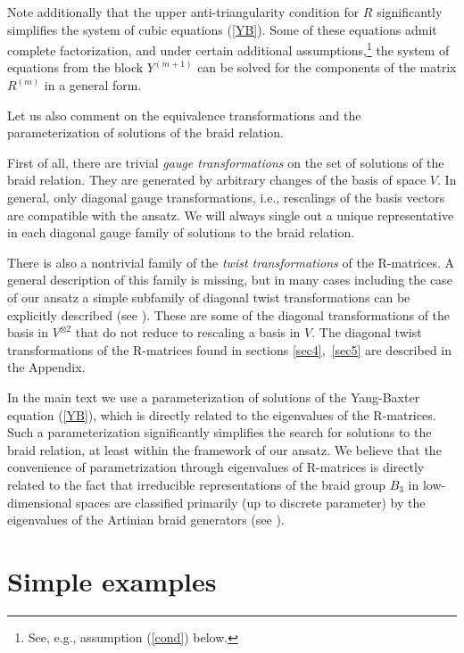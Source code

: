\documentclass[11pt]{article}
\begin{document}
Note additionally that the upper anti-triangularity condition for $R$ significantly simplifies the system of  cubic equations (\ref{YB}). Some of these equations admit complete factorization, and under certain additional assumptions,\footnote{See, e.g., assumption (\ref{cond}) below.} the system of equations from the block $Y^{(m+1)}$ can be solved for the components of the matrix $R^{(m)}$ in a general form.
\medskip

Let us also comment on the equivalence transformations and the parameterization of solutions of the braid relation.

First of all, there are trivial {\em gauge transformations} on the set of solutions of the braid relation. They are generated by arbitrary changes of the basis of space $V$. In general, only diagonal gauge transformations, i.e., rescalings of the basis vectors are compatible with the ansatz. We will always single out a unique representative in each diagonal gauge family of solutions to the braid relation.


There is also a nontrivial family of the {\em twist transformations} of the R-matrices. A general description of this family is missing, but in many cases including the case of our ansatz  a simple subfamily of diagonal twist transformations can be explicitly described (see \cite{Resh,I,IOP3}). These are some of the diagonal transformations of the basis in $V^{\otimes 2}$ that do not reduce to rescaling a basis in $V$. The diagonal twist transformations of the R-matrices found in sections \ref{sec4},~\ref{sec5}  are described in the Appendix.

In the main text we use a parameterization of solutions of the Yang-Baxter equation (\ref{YB}), which is directly related to the eigenvalues of the R-matrices. 
Such a parameterization significantly simplifies the search for solutions to the braid relation, at least within the framework of our ansatz. 
We believe that the convenience of parametrization through eigenvalues of R-matrices is directly related  to the fact that irreducible representations of the braid group $B_3$ in low-dimensional spaces are classified primarily (up to discrete parameter) by the eigenvalues of
 the Artinian braid generators (see \cite{TW,PT}).



\section{Simple examples}
\end{document}
